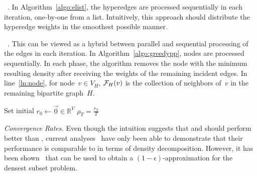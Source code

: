 \begin{compactitem}

\item \elist~\cite{DBLP:conf/www/DanischCS17,DBLP:journals/pvldb/SunDCS20}.  In Algorithm~\ref{algo:elist}, 
the hyperedges are processed sequentially in each iteration, one-by-one from a list. Intuitively, this approach should distribute the hyperedge weights in the smoothest possible manner.


\item \greedypp~\cite{DBLP:conf/www/BoobGPSTWW20}.
This can be viewed as a hybrid between parallel and sequential
processing of the edges in each iteration.
In Algorithm~\ref{algo:greedypp}, 
nodes are processed sequentially. In each phase, the algorithm removes the node with the minimum resulting density after receiving the weights of the remaining incident edges.
In line~\ref{ln:node},
for node~$v \in V_H$, 
$\mathcal {F}_H(v)$ is the collection of neighbors of~$v$ in the remaining bipartite graph~$H$.

\end{compactitem}


\begin{algorithm}
	\SetAlgoLined
	
		Set initial $r_0 \gets \vec{0} \in \mathbb{R}^V$\;
		\Return $\rho_T = \frac{r_T}{T}$
	
	\caption{\elist}
	\label{algo:elist}
\end{algorithm}


\noindent \emph{Convergence Rates.}
Even though the intuition suggests that \elist and \greedypp should perform better
than \fw, 
current analyses~\cite{DBLP:conf/www/BoobGPSTWW20,DBLP:conf/esa/HarbQC23}
have only been able to demonstrate that their performance is comparable to \fw in terms of density decomposition. 
However, it has been shown~\cite{DBLP:conf/soda/ChekuriQT22} that \greedypp can be used to 
obtain a $(1-\epsilon)$-approximation for the densest subset problem.



